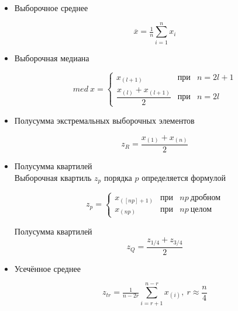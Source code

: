 \documentclass[12pt,a4paper]{article}
\begin{document}
	\begin{itemize}
		\item Выборочное среднее

		\begin{equation} \label{eq:mean}
			\overline{x} = \tfrac{1}{n}\sum_{i = 1}^{n}x_i
		\end{equation}

		\item Выборочная медиана

		\begin{equation} \label{eq:median}
			med\ x = \left\{
			\begin{array}{ccl}
			x_{(l + 1)} & \text{при} & n = 2l + 1\\
			\dfrac{x_{(l)} + x_{(l + 1)}}{2} & \text{при} & n = 2l
			\end{array}
			\right.
		\end{equation}

		\item Полусумма экстремальных выборочных элементов

		\begin{equation} \label{eq:half_sum_of_extremal_elements}
			z_{R} = \frac{x_{(1)} + x_{(n)}}{2}
		\end{equation}

		\item Полусумма квартилей \\
		Выборочная квартиль $z_{p}$ порядка $p$ определяется формулой

		\begin{equation} \label{eq:quartil}
			z_{p} = \left\{
			\begin{array}{ccl}
			x_{([np]+ 1)} & \text{при} & np\ \text{дробном}\\
			x_{(np)} & \text{при} & np\ \text{целом}
			\end{array}
			\right.
		\end{equation}

		Полусумма квартилей \\

		\begin{equation}  \label{eq:half_sum_of_quartiles}
			z_{Q} = \dfrac{z_{1/4} + z_{3/4}}{2}
		\end{equation}

		\item Усечённое среднее

		\begin{equation} \label{eq:trimmed_mean}
			z_{tr} = \tfrac{1}{n - 2r}\sum_{i = r + 1}^{n - r}x_{(i)},\ r\approx\dfrac{n}{4}
		\end{equation}


\end{itemize}
\end{document}
